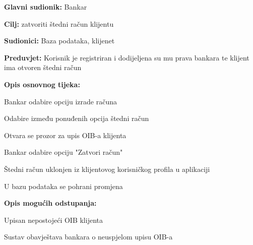                     \noindent {}
                \begin{packed_item}
                
                  \item \textbf{Glavni sudionik: }Bankar
                  \item  \textbf{Cilj:} zatvoriti štedni račun klijentu
                  \item  \textbf{Sudionici:} Baza podataka, klijenet
                  \item  \textbf{Preduvjet:} Korisnik je registriran i dodijeljena su mu prava bankara te klijent ima otvoren štedni račun
                  \item  \textbf{Opis osnovnog tijeka:}
                  
                  \item[] \begin{packed_enum}
                
                    \item Bankar odabire opciju izrade računa 
                    \item Odabire između  ponuđenih opcija štedni račun
                    \item Otvara se prozor za upis OIB-a klijenta
                    \item Bankar odabire opciju "Zatvori račun"
                    \item Štedni račun uklonjen iz klijentovog korisničkog profila u aplikaciji
                    \item U bazu podataka se pohrani promjena
                  \end{packed_enum}
                  
                  \item  \textbf{Opis mogućih odstupanja:}
                  
                  \item[] \begin{packed_item}
                
                    \item[3.a] Upisan nepostojeći OIB klijenta
                    \item[] \begin{packed_enum}
                      
                      \item Sustav obavještava bankara o neuspjelom upisu OIB-a
                      
                    \end{packed_enum}
                    
                  \end{packed_item}
                \end{packed_item}
                
